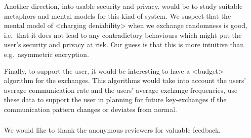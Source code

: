Another direction, into usable security and privacy, would be to study suitable 
metaphors and mental models for this kind of system.
We suspect that the mental model of <charging deniability> when we exchange 
randomness is good, i.e.~that it does not lead to any contradictory behaviours 
which might put the user's security and privacy at risk.
Our guess is that this is more intuitive than e.g.~asymmetric encryption.

Finally, to support the user, it would be interesting to have a <budget> 
algorithm for the exchanges.
This algorithms would take into account the users' average communication rate 
and the users' average exchange frequencies, use these data to support the user 
in planning for future key-exchanges if the communication pattern changes or 
deviates from normal.


\subsubsection*{\ackname}

We would like to thank the anonymous reviewers for valuable feedback.


\printbibliography{}

